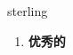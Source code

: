 
\begin{frame}
{\huge sterling}
\begin{center}
\begin{enumerate}\Large
  \item \textbf{优秀的}
\end{enumerate}
\end{center}
\end{frame}
